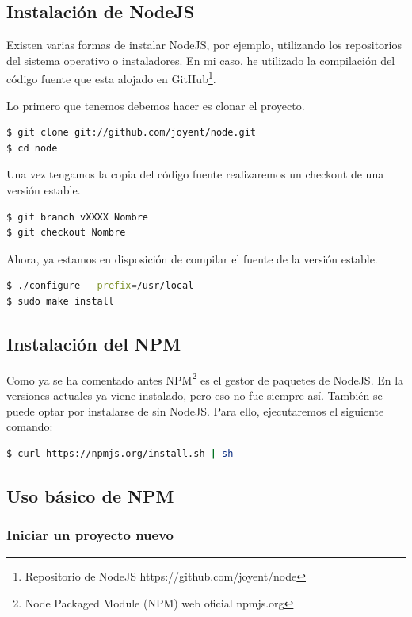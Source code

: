 \subsection{Instalación de NodeJS}
Existen varias formas de instalar NodeJS, por ejemplo, utilizando los repositorios del sistema operativo o instaladores. En mi caso, he utilizado la compilación del código fuente que esta alojado en GitHub\footnote{Repositorio de NodeJS https://github.com/joyent/node}. 

Lo primero que tenemos debemos hacer es clonar el proyecto.

\begin{lstlisting}[language=bash, numbers=none]
$ git clone git://github.com/joyent/node.git
$ cd node
\end{lstlisting}

Una vez tengamos la copia del código fuente realizaremos un checkout de una versión estable.

\begin{lstlisting}[language=bash, numbers=none]
$ git branch vXXXX Nombre
$ git checkout Nombre
\end{lstlisting}

Ahora, ya estamos en disposición de compilar el fuente de la versión estable. 

\begin{lstlisting}[language=bash, numbers=none]
$ ./configure --prefix=/usr/local 
$ sudo make install
\end{lstlisting}

\subsection{Instalación del NPM}
Como ya se ha comentado antes NPM\footnote{Node Packaged Module (NPM) web oficial npmjs.org} es el gestor de paquetes de NodeJS. En la versiones actuales ya viene instalado, pero eso no fue siempre así. También se puede optar por instalarse de sin
NodeJS. Para ello, ejecutaremos el siguiente comando:

\begin{lstlisting}[language=bash, numbers=none]
$ curl https://npmjs.org/install.sh | sh
\end{lstlisting}

\subsection{Uso básico de NPM}

\subsubsection{Iniciar un proyecto nuevo}

